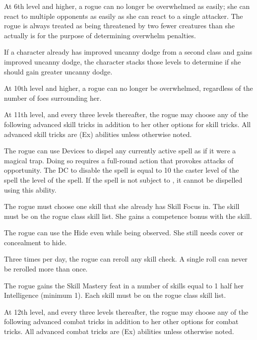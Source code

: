  At 6th level and higher, a rogue can no longer be overwhelmed as easily; she can react to multiple opponents as easily as she can react to a single attacker. The rogue is always treated as being threatened by two fewer creatures than she actually is for the purpose of determining overwhelm penalties. 

\par If a character already has improved uncanny dodge from a second class and gains improved uncanny dodge, the character stacks those levels to determine if she should gain greater uncanny dodge.

 At 10th level and higher, a rogue can no longer be overwhelmed, regardless of the number of foes surrounding her.

 At 11th level, and every three levels thereafter, the rogue may choose any of the following advanced skill tricks in addition to her other options for skill tricks. All advanced skill tricks are (Ex) abilities unless otherwise noted.

 The rogue can use Devices to dispel any currently active spell as if it were a magical trap. Doing so requires a full-round action that provokes attacks of opportunity. The DC to disable the spell is equal to 10 \add the caster level of the spell \add the level of the spell. If the spell is not subject to , it cannot be dispelled using this ability.

 The rogue must choose one skill that she already has Skill Focus in. The skill must be on the rogue class skill list. She gains a  competence bonus with the skill.

 The rogue can use the Hide even while being observed. She still needs cover or concealment to hide.

 Three times per day, the rogue can reroll any skill check. A single roll can never be rerolled more than once.

 The rogue gains the Skill Mastery feat in a number of skills equal to 1 \add half her Intelligence (minimum 1). Each skill must be on the rogue class skill list.

 At 12th level, and every three levels thereafter, the rogue may choose any of the following advanced combat tricks in addition to her other options for combat tricks. All advanced combat tricks are (Ex) abilities unless otherwise noted.

